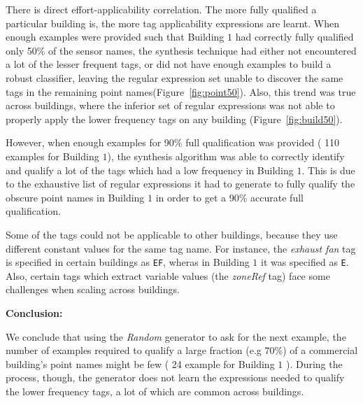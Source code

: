 There is direct effort-applicability correlation. The more fully qualified a particular building is, the more tag applicability expressions are learnt. When enough examples were provided such that Building $1$ had correctly fully qualified only 50\% of the sensor names, the synthesis technique had either not encountered a lot of the lesser frequent tags, or did not have enough examples to build a robust classifier, leaving the regular expression set unable to discover the same tags in the remaining point names(Figure~\ref{fig:point50}). Also, this trend was true across buildings, where the inferior set of regular expressions was not able to properly apply the lower frequency tags on any building (Figure~\ref{fig:build50}).

However, when enough examples for 90\% full qualification was provided ( 110 examples for Building $1$), the synthesis algorithm was able to correctly identify and qualify a lot of the tags which had a low frequency in Building $1$. This is due to the exhaustive list of regular expressions it had to generate to fully qualify the obscure point names in Building $1$ in order to get a 90\% accurate full qualification. 


Some of the tags could not be applicable to other buildings, because they use different constant values for the same tag name. For instance, the {\it exhaust fan} tag is specified in certain buildings as \texttt{EF}, wheras in Building $1$ it was specified as \texttt{E}. Also, certain tags which extract variable values (the {\it zoneRef} tag) face some challenges when scaling across buildings. 

{\bf Conclusion:}

We conclude that using the {\it Random} generator to ask for the next example, the number of examples required to qualify a large fraction (e.g 70\%) of a commercial building's point names might be few ( 24 example for Building $1$ ). During the process, though, the generator does not learn the expressions needed to qualify the lower frequency tags, a lot of which are common across buildings. 

